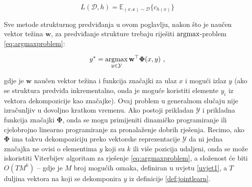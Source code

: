 \begin{equation} \label{eq:funcloss}
  L(\mathcal{D}, h) = \mathbb{E}_{(x, \mathbf{c}) \sim \mathcal{D}} \{c_{h(x)}\}
\end{equation}

\noindent
Sve metode strukturnog predviđanja u ovom poglavlju, nakon što je naučen vektor
težina $\mathbf{w}$, za predviđanje strukture trebaju riješiti $\operatorname*{argmax}$-problem
\ref{eq:argmaxproblem}:

\begin{equation}\label{eq:argmaxproblem}
  y\ssymbol{1} = \argmax_{y \in \mathcal{Y}} \mathbf{w}^\top \mathbf{\Phi}(x, y) \text{ ,}
\end{equation}

\noindent
gdje je $\mathbf{w}$ naučen vektor težina i \mathbf{\Phi} funkcija značajki za
ulaz $x$ i mogući izlaz $y$ (ako se struktura predviđa inkrementalno, onda je
moguće koristiti elemente $y_i$ iz vektora dekompozicije kao značajke). Ovaj
problem u generalnom slučaju nije izračunljiv u dovoljno kratkom vremenu. Ako
postoji prikladan $\mathcal{Y}$ i prikladna funkcija značajki $\mathbf{\Phi}$,
onda se mogu primijeniti dinamičko programiranje  ili
cjelobrojno linearno programiranje  za
pronalaženje dobrih rješenja. Recimo, ako $\mathbf{\Phi}$ ima takvu
dekompoziciju preko vektorske reprezentacije $\mathcal{Y}$ da ni jedna značajka
ne ovisi o elementima $y$ koji su $k$ ili više pozicija udaljeni, onda se može
iskoristiti Viterbijev algoritam za rješenje \ref{eq:argmaxproblem}, a složenost će
biti $O(T M^k)$ -- gdje je $M$ broj mogućih oznaka, definiran u uvjetu
\ref{uvjet1}, a $T$ duljina vektora na koji se dekomponira $y$ iz definicije
\ref{def:jointlearn}.
